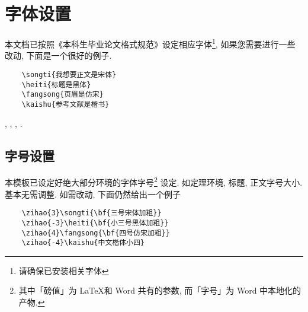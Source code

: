 \chapter{字体设置}
本文档已按照《本科生毕业论文格式规范》设定相应字体\footnote{请确保已安装相关字体}, 如果您需要进行一些改动, 下面是一个很好的例子.    
\begin{lstlisting}
    \songti{我想要正文是宋体}
    \heiti{标题是黑体}
    \fangsong{页眉是仿宋}
    \kaishu{参考文献是楷书}
\end{lstlisting}
, , , .
\section{字号设置}
本模板已设定好绝大部分环境的字体字号\footnote{其中「磅值」为 \LaTeX 和 Word 共有的参数, 而「字号」为 Word 中本地化的产物.} 设定. 如定理环境, 标题, 正文字号大小. 基本无需调整. 如需改动, 下面仍然给出一个例子

\begin{lstlisting}
    \zihao{3}\songti{\bf{三号宋体加粗}}
    \zihao{-3}\heiti{\bf{小三号黑体加粗}}
    \zihao{4}\fangsong{\bf{四号仿宋加粗}}
    \zihao{-4}\kaishu{中文楷体小四}
\end{lstlisting}




